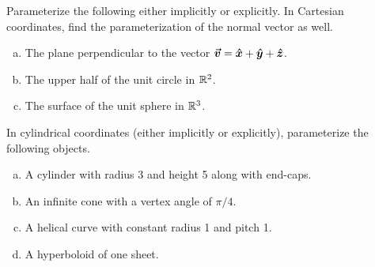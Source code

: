 \documentclass[12pt]{article} %
\begin{document}
\begin{problem} 
Parameterize the following either implicitly or explicitly. In Cartesian coordinates, find the parameterization of the normal vector as well.
\begin{enumerate}[(a)]
	\item The plane perpendicular to the vector $\boldsymbol{\vec{v}} = \boldsymbol{\hat{x}} + \boldsymbol{\hat{y}} + \boldsymbol{\hat{z}}$.
	\item The upper half of the unit circle in $\mathbb{R}^2$.
	\item The surface of the unit sphere in $\mathbb{R}^3$.
\end{enumerate}
\end{problem}

\begin{problem}
	In cylindrical coordinates (either implicitly or explicitly), parameterize the following objects.
	\begin{enumerate}[(a)]
		\item A cylinder with radius 3 and height 5 along with end-caps.
		\item An infinite cone with a vertex angle of $\pi/4$.
		\item A helical curve with constant radius 1 and pitch 1.
		\item A hyperboloid of one sheet.
	\end{enumerate}
\end{problem}
\end{document}

